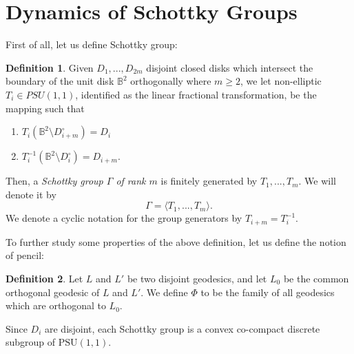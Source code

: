 \documentclass[12pt,oneside]{sfsuthesis}
\theoremstyle{plain} %
\theoremstyle{definition}  %
\newtheorem{definition}{Definition}[chapter]
\theoremstyle{remark}  %
\theoremstyle{plain}
\begin{document}
{%

\section{Dynamics of Schottky Groups}\label{Dynamics of Schottky Groups}


First of all, let us define Schottky group:
\begin{definition}\label{def schottky}
Given $D_1,...,D_{2m}$ disjoint closed disks which intersect the boundary of the unit disk $\mathbb{B}^2$ orthogonally where $m\geq 2$, we let non-elliptic $T_i\in PSU (1,1)$, identified as the linear fractional transformation, be the  mapping such that 
\begin{enumerate}
\item $T_i (\mathbb{B}^2\setminus D^{\circ}_{i+m}) = D_{i}$
\item $T_i^{-1}\left( \mathbb{B}^2\setminus D^{\circ}_{i}\right)=D_{i+m}$.
\end{enumerate}
Then, a {\it Schottky group $\Gamma$ of rank $m$} is finitely generated by $T_1,...,T_m$. We will denote it by  
$$
\Gamma = \langle T_1,...,T_m\rangle. 
$$
We denote a cyclic notation for the group generators by $T_{i+m} = T_i^{-1}$.  
\end{definition}

To further study some properties of the above definition, let us define the notion of pencil:
\begin{definition}\label{family of isometric circles}
Let $L$ and $L'$ be two disjoint geodesics, and let $L_0$ be the common orthogonal geodesic of $L$ and $L'$. We define $\Phi$ to be the family of all geodesics which are orthogonal to $L_0$. %
\end{definition}




Since $D_i$ are disjoint, each Schottky group is a convex co-compact discrete subgroup of $\text{PSU}(1,1)$.

}
\end{document}
